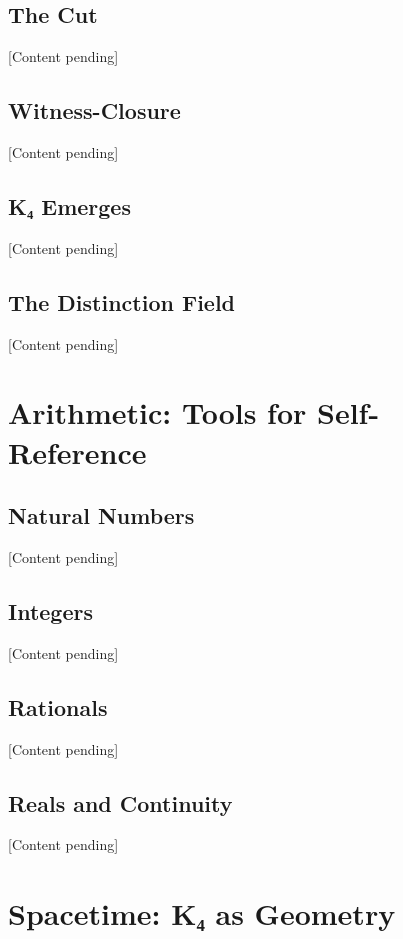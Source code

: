 \documentclass[11pt,a4paper]{book}
\begin{document}
\chapter{The Cut}

[Content pending]

\chapter{Witness-Closure}

[Content pending]

\chapter{K₄ Emerges}

[Content pending]

\chapter{The Distinction Field}

[Content pending]


\part{Arithmetic: Tools for Self-Reference}

\chapter{Natural Numbers}

[Content pending]

\chapter{Integers}

[Content pending]

\chapter{Rationals}

[Content pending]

\chapter{Reals and Continuity}

[Content pending]


\part{Spacetime: K₄ as Geometry}
\end{document}
